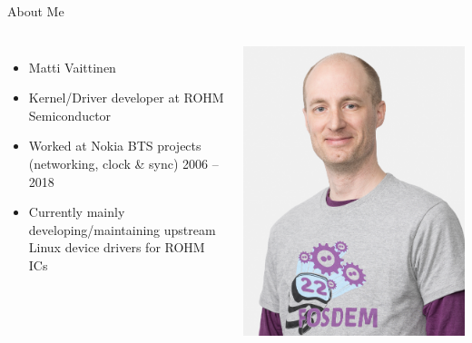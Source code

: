 \documentclass[aspectratio=169]{beamer}
\begin{document}
\begin{frame}{About Me}
	\begin{columns}
		\begin{itemize}
			\item Matti Vaittinen
			\item Kernel/Driver developer at ROHM Semiconductor
			\item Worked at Nokia BTS projects (networking, clock \& sync) 2006 – 2018
			\item Currently mainly developing/maintaining upstream Linux device drivers for ROHM ICs
		\end{itemize}
		\includegraphics[width=0.9\linewidth]{img/me.png}
	\end{columns}
\end{frame}

\end{document}
